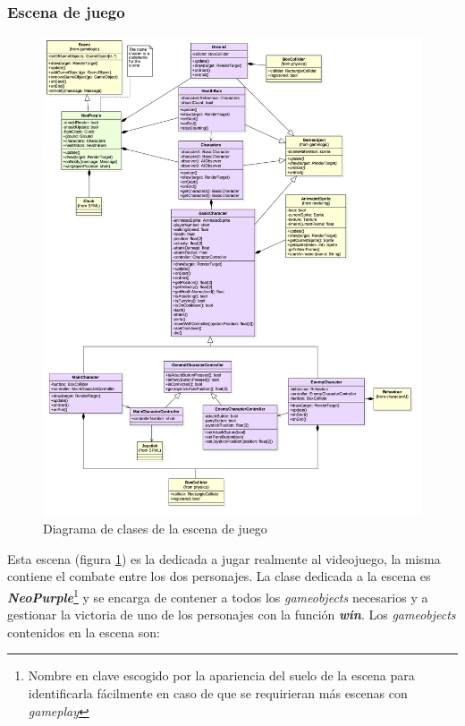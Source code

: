 \subsubsection*{Escena de juego}

\begin{figure}
	\caption{Diagrama de clases de la escena de juego}
	\hspace*{-0.1cm}  
	\centerline{\includegraphics[width=20cm]{otros/UML/png/alld/png/gamelogic__gameplay__diagramaDeClases_scene_gameplay_4.png}}
	\label{class:gameplay}
\end{figure}

Esta escena (figura \ref{class:gameplay}) es la dedicada a jugar realmente al videojuego, la misma contiene el combate entre los dos personajes. La clase dedicada a la escena es \textbf{\textit{NeoPurple}}\footnote{Nombre en clave escogido por la apariencia del suelo de la escena para identificarla fácilmente en caso de que se requirieran más escenas con \textit{gameplay}} y se encarga de contener a todos los \textit{gameobjects} necesarios y a gestionar la victoria de uno de los personajes con la función \textbf{\textit{win}}. Los \textit{gameobjects} contenidos en la escena son:

